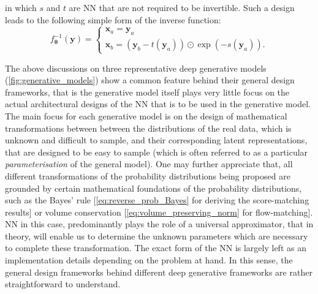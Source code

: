in which $s$ and $t$ are NN that are not required to be invertible. Such a design leads to the following simple form of the inverse function:
\begin{equation}
    \label{eq:invertible_NN_inverse}
    f_{\boldsymbol{\theta}}^{-1}(\bm{y})=
    \begin{cases}
        \bm{x}_a=\bm{y}_a\\
        \bm{x}_b=(\bm{y}_b-t(\bm{y}_a))\odot \exp(-s(\bm{y}_a)).
    \end{cases}
\end{equation}
 


The above discussions on three representative deep generative models (\cref{fig:generative_models}) show a common feature behind their general design frameworks, that is the generative model itself plays very little focus on the actual architectural designs of the NN that is to be used in the generative model. The main focus for each generative model is on the design of mathematical transformations between between the distributions of the real data, which is unknown and difficult to sample,  and their corresponding latent representations, that are designed to be easy to sample (which is often referred to as a particular \textit{parameterisation} of the general model). One may further appreciate that, all different transformations of the probability distributions being proposed are grounded by certain mathematical foundations of the probability distributions, such as the Bayes' rule  [\cref{eq:reverse_prob_Bayes} for deriving the score-matching results] or volume conservation [\cref{eq:volume_preserving_norm} for flow-matching]. NN in this case, predominantly plays the role of a universal approximator, that in theory, will enable us to determine the unknown parameters which are necessary to complete these transformation. The exact form of the NN is largely left as an implementation details depending on the problem at hand. In this sense, the general design frameworks behind different deep generative frameworks are rather straightforward to understand.

